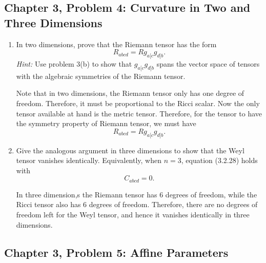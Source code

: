 \subsection{Chapter 3, Problem 4: Curvature in Two and Three Dimensions}

\begin{enumerate}[label=\alph*)]
    \item In two dimensions, prove that the Riemann tensor has the form
    \begin{equation}
        R_{abcd}=R g_{a[c}g_{d]b}.
    \end{equation}
    \textit{Hint:} Use problem 3(b) to show that $g_{a[c}g_{d]b}$ spans the
    vector space of tensors with the algebraic symmetries of the Riemann tensor.
    \begin{solution}
        Note that in two dimensions, the Riemann tensor only has one degree of freedom. Therefore, it must be proportional to the Ricci scalar. Now the only tensor available at hand is the metric tensor. Therefore, for the tensor to have the symmetry property of Riemann tensor, we must have
        \begin{equation}
            R_{abcd}=R g_{a[c}g_{d]b}.
        \end{equation}
    \end{solution}

    \item Give the analogous argument in three dimensions to show that the Weyl
    tensor vanishes identically. Equivalently, when $n=3$, equation (3.2.28)
    holds with
    \begin{equation}
        C_{abcd}=0.
    \end{equation}
    \begin{solution}
        In three dimension,s the Riemann tensor has 6 degrees of freedom, while the Ricci tensor also has 6 degrees of freedom. Therefore, there are no degrees of freedom left for the Weyl tensor, and hence it vanishes identically in three dimensions.
    \end{solution}
\end{enumerate}

\subsection{Chapter 3, Problem 5: Affine Parameters}


